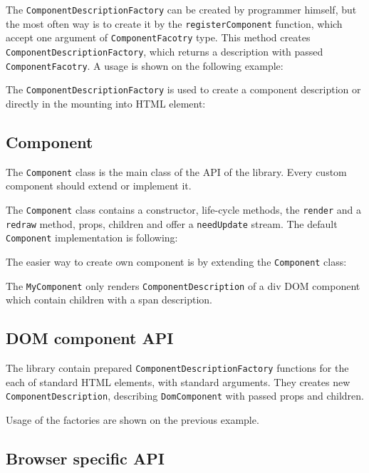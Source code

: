   The \texttt{ComponentDescriptionFactory} can be created by programmer himself, 
  but the most often way is to create it by the \texttt{registerComponent} function, which accept one argument of \texttt{ComponentFacotry} type.
  This method creates \texttt{ComponentDescriptionFactory}, which returns a description with passed \texttt{ComponentFacotry}.
  A usage is shown on the following example:
  

  The \texttt{ComponentDescriptionFactory} is used to create a component description or directly in the mounting into HTML element:
  

  \subsection{Component}\label{subsec:our-api-component}

    The \texttt{Component} class is the main class of the API of the \tiles library.
    Every custom component should extend or implement it. 

    The \texttt{Component} class contains a constructor, life-cycle methods, 
    the \texttt{render} and a \texttt{redraw} method, props, children and offer a \texttt{needUpdate} stream.
    The default \texttt{Component} implementation is following: 
    

    The easier way to create own component is by extending the \texttt{Component} class:
    

    The \texttt{MyComponent} only renders \texttt{ComponentDescription} of a div DOM component which contain children with a span description.

  \subsection{DOM component API}\label{subsec:our-api-dom}

    The \tiles library contain prepared \texttt{ComponentDescriptionFactory} functions for the each of standard HTML elements, 
    with standard arguments. 
    They creates new \texttt{ComponentDescription}, describing \texttt{DomComponent} with passed props and children.

    Usage of the factories are shown on the previous example.

  \subsection{Browser specific API}\label{subsec:our-api-browser}
    
